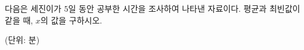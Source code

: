 다음은 세진이가 $5$일 동안 공부한 시간을 조사하여 나타낸 자료이다. 평균과 최빈값이 같을 때, $x$의 값을 구하시오.\par{\raggedleft\small (단위: 분)\par}
